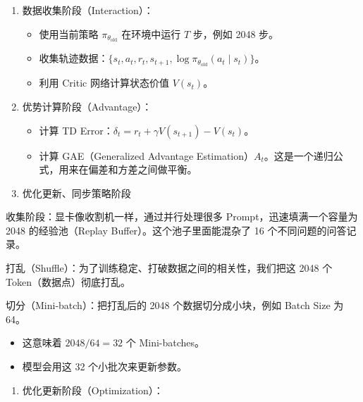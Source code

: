 \begin{enumerate}
\def\labelenumi{\arabic{enumi}.}
\tightlist
\item
{}
  数据收集阶段（Interaction）：

  \begin{itemize}
  \tightlist
  \item
    使用当前策略 \(\pi_{\theta_{\mathrm{old}}}\) 在环境中运行 \(T\) 步，例如 2048 步。
  \item
    收集轨迹数据：\(\{s_t, a_t, r_t, s_{t+1}, \log \pi_{\theta_{\mathrm{old}}}(a_t \mid s_t)\}\)。
  \item
    利用 Critic 网络计算状态价值 \(V(s_t)\)。
  \end{itemize}
\item
{}
  优势计算阶段（Advantage）：

  \begin{itemize}
  \tightlist
  \item
    计算 TD Error：\(\delta_t = r_t + \gamma V(s_{t+1}) - V(s_t)\)。
  \item
    计算 GAE（Generalized Advantage Estimation）\(A_t\)。这是一个递归公式，用来在偏差和方差之间做平衡。
  \end{itemize}
\item
  优化更新、同步策略阶段
\end{enumerate}

收集阶段：显卡像收割机一样，通过并行处理很多 Prompt，迅速填满一个容量为 2048 的经验池（Replay Buffer）。这个池子里面能混杂了 16 个不同问题的问答记录。

打乱（Shuffle）：为了训练稳定、打破数据之间的相关性，我们把这 2048 个 Token（数据点）彻底打乱。

切分（Mini-batch）：把打乱后的 2048 个数据切分成小块，例如 Batch Size 为 64。

\begin{itemize}
\tightlist
\item
  这意味着 \(2048 / 64 = 32\) 个 Mini-batches。
\item
  模型会用这 32 个小批次来更新参数。
\end{itemize}

\begin{enumerate}
\def\labelenumi{\arabic{enumi}.}
\setcounter{enumi}{2}
\tightlist
\item
{}
  优化更新阶段（Optimization）：
\end{enumerate}

